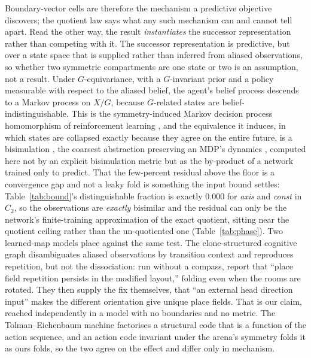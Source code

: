 Boundary-vector cells are therefore the mechanism a predictive objective discovers; the quotient law
says what any such mechanism can and cannot tell apart. Read the other way, the result
\emph{instantiates} the successor representation rather than competing with it. The successor
representation \citep{stachenfeld2017, momennejad2017successor} is predictive, but over a state space
that is supplied rather than inferred from aliased observations, so whether two symmetric compartments
are one state or two is an assumption, not a result. Under $G$-equivariance, with a $G$-invariant prior
and a policy measurable with respect to the aliased belief, the agent's belief process descends to a
Markov process on $X/G$, because $G$-related states are belief-indistinguishable. This is the
symmetry-induced Markov decision process homomorphism of reinforcement learning \citep{givan2003,
ravindran2004, vanderpol2020}, and the equivalence it induces, in which states are collapsed exactly
because they agree on the entire future, is a bisimulation \citep{ferns2004}, the coarsest abstraction
preserving an MDP's dynamics \citep{li2006}, computed here not by an explicit bisimulation metric but as
the by-product of a network trained only to predict. That the few-percent residual above the floor is a
convergence gap and not a leaky fold is something the input bound settles: Table~\ref{tab:bound}'s
distinguishable fraction is exactly $0.000$ for \textit{axis} and \textit{const} in $C_2$, so the
observations are \emph{exactly} bisimilar and the residual can only be the network's finite-training
approximation of the exact quotient, sitting near the quotient ceiling rather than the un-quotiented one
(Table~\ref{tab:phase}). Two learned-map models place against the same test. The clone-structured
cognitive graph \citep{george2021, raju2024} disambiguates aliased observations by transition context
and reproduces repetition, but not the dissociation: run without a compass, \citet{raju2024} report that
``place field repetition persists in the modified layout,'' folding even when the rooms are rotated.
They then supply the fix themselves, that ``an external head direction input'' makes the different
orientation give unique place fields. That is our claim, reached independently in a model with no
boundaries and no metric. The Tolman--Eichenbaum machine \citep{whittington2020tolman} factorises a
structural code that is a function of the action sequence, and an action code invariant under the
arena's symmetry folds it as ours folds, so the two agree on the effect and differ only in mechanism.
